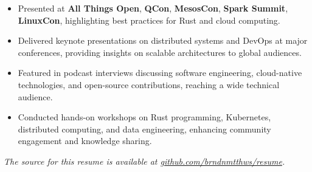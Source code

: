 \documentclass[margin,line]{resume}
\begin{document}
\begin{resume}
\begin{itemize}[partopsep=0mm]
    \item Presented at \textbf{All Things Open}, \textbf{QCon}, \textbf{MesosCon}, \textbf{Spark Summit}, \textbf{LinuxCon}, highlighting best practices for Rust and cloud computing.
    \item Delivered keynote presentations on distributed systems and DevOps at major conferences, providing insights on scalable architectures to global audiences.
    \item Featured in podcast interviews discussing software engineering, cloud-native technologies, and open-source contributions, reaching a wide technical audience.
    \item Conducted hands-on workshops on Rust programming, Kubernetes, distributed computing, and data engineering, enhancing community engagement and knowledge sharing.
\end{itemize}

\end{resume}

\vspace*{\fill}

\textit{The source for this resume is available at \href{https://github.com/brndnmtthws/resume}{github.com/brndnmtthws/resume}.}
\end{document}

